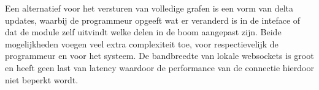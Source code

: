 Een alternatief voor het versturen van volledige grafen is een vorm van delta updates, waarbij de programmeur opgeeft wat er veranderd is in de inteface of dat de module zelf uitvindt welke delen in de boom aangepast zijn. Beide mogelijkheden voegen veel extra complexiteit toe, voor respectievelijk de programmeur en voor het systeem. De bandbreedte van lokale websockets is groot en heeft geen last van latency waardoor de performance van de connectie hierdoor niet beperkt wordt.
